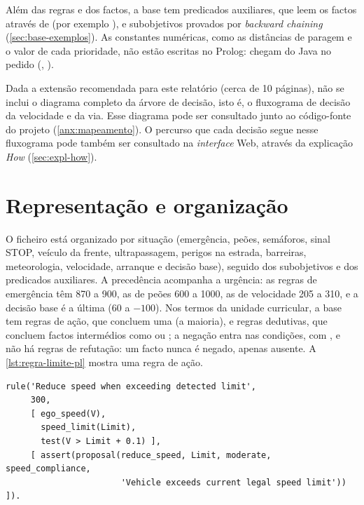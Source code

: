 Além das regras e dos factos, a base tem predicados auxiliares, que leem os
factos através de  (por exemplo ), e
subobjetivos provados por \emph{backward chaining} (\cref{sec:base-exemplos}). As
constantes numéricas, como as distâncias de paragem e o valor de cada
prioridade, não estão escritas no Prolog: chegam do Java no pedido
 (, ).

Dada a extensão recomendada para este relatório (cerca de 10 páginas), não se
inclui o diagrama completo da árvore de decisão, isto é, o fluxograma de decisão
da velocidade e da via.
Esse diagrama pode
ser consultado junto ao código-fonte do projeto (\cref{anx:mapeamento}).
O percurso que cada decisão segue nesse fluxograma pode também ser consultado
na \emph{interface} Web, através da explicação \emph{How} (\cref{sec:expl-how}).

\section{Representação e organização}
\label{sec:base-representacao}

O ficheiro  está organizado por situação (emergência,
peões, semáforos, sinal STOP, veículo da frente, ultrapassagem, perigos na
estrada, barreiras, meteorologia, velocidade, arranque e decisão base), seguido
dos subobjetivos e dos predicados auxiliares. A precedência acompanha a
urgência: as regras de emergência têm 870 a 900, as de peões 600 a 1000, as de
velocidade 205 a 310, e a decisão base é a última (60 a $-100$). Nos termos da
unidade curricular, a base tem regras de ação, que concluem uma  (a
maioria), e regras dedutivas, que concluem factos intermédios como
 ou ; a negação entra nas
condições, com , e não há regras de refutação: um facto nunca é
negado, apenas ausente. A \cref{lst:regra-limite-pl} mostra uma regra de ação.

\begin{lstlisting}[caption={Regra de excesso de velocidade em Prolog (\texttt{driving\_rules.pl})},label=lst:regra-limite-pl]
rule('Reduce speed when exceeding detected limit',
     300,
     [ ego_speed(V),
       speed_limit(Limit),
       test(V > Limit + 0.1) ],
     [ assert(proposal(reduce_speed, Limit, moderate, speed_compliance,
                       'Vehicle exceeds current legal speed limit')) ]).
\end{lstlisting}

